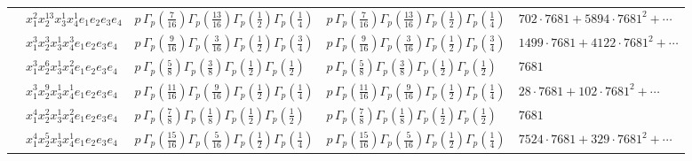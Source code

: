 \documentclass[11pt]{article}
\begin{document}
\begin{table}[ht]
{\begin{tabular}{@{}lllll@{}}
 & $x_{1}^{2} x_{2}^{13} x_{3}^{1} x_{4}^{1}  e_{1} e_{2} e_{3} e_{4}$ & $p \, \Gamma_p \left( \frac{7}{16} \right) \Gamma_p \left( \frac{13}{16} \right) \Gamma_p \left( \frac{1}{2} \right) \Gamma_p \left( \frac{1}{4} \right)$ & $p \, \Gamma_p \left( \frac{7}{16} \right) \Gamma_p \left( \frac{13}{16} \right) \Gamma_p \left( \frac{1}{2} \right) \Gamma_p \left( \frac{1}{4} \right)$ & $702{\cdot}7681{+}5894{\cdot}7681^{2}{+}\cdots$ \\
 & $x_{1}^{3} x_{2}^{3} x_{3}^{1} x_{4}^{3}  e_{1} e_{2} e_{3} e_{4}$ & $p \, \Gamma_p \left( \frac{9}{16} \right) \Gamma_p \left( \frac{3}{16} \right) \Gamma_p \left( \frac{1}{2} \right) \Gamma_p \left( \frac{3}{4} \right)$ & $p \, \Gamma_p \left( \frac{9}{16} \right) \Gamma_p \left( \frac{3}{16} \right) \Gamma_p \left( \frac{1}{2} \right) \Gamma_p \left( \frac{3}{4} \right)$ & $1499{\cdot}7681{+}4122{\cdot}7681^{2}{+}\cdots$ \\
 & $x_{1}^{3} x_{2}^{6} x_{3}^{1} x_{4}^{2}  e_{1} e_{2} e_{3} e_{4}$ & $p \, \Gamma_p \left( \frac{5}{8} \right) \Gamma_p \left( \frac{3}{8} \right) \Gamma_p \left( \frac{1}{2} \right) \Gamma_p \left( \frac{1}{2} \right)$ & $p \, \Gamma_p \left( \frac{5}{8} \right) \Gamma_p \left( \frac{3}{8} \right) \Gamma_p \left( \frac{1}{2} \right) \Gamma_p \left( \frac{1}{2} \right)$ & $7681$ \\
 & $x_{1}^{3} x_{2}^{9} x_{3}^{1} x_{4}^{1}  e_{1} e_{2} e_{3} e_{4}$ & $p \, \Gamma_p \left( \frac{11}{16} \right) \Gamma_p \left( \frac{9}{16} \right) \Gamma_p \left( \frac{1}{2} \right) \Gamma_p \left( \frac{1}{4} \right)$ & $p \, \Gamma_p \left( \frac{11}{16} \right) \Gamma_p \left( \frac{9}{16} \right) \Gamma_p \left( \frac{1}{2} \right) \Gamma_p \left( \frac{1}{4} \right)$ & $28{\cdot}7681{+}102{\cdot}7681^{2}{+}\cdots$ \\
 & $x_{1}^{4} x_{2}^{2} x_{3}^{1} x_{4}^{2}  e_{1} e_{2} e_{3} e_{4}$ & $p \, \Gamma_p \left( \frac{7}{8} \right) \Gamma_p \left( \frac{1}{8} \right) \Gamma_p \left( \frac{1}{2} \right) \Gamma_p \left( \frac{1}{2} \right)$ & $p \, \Gamma_p \left( \frac{7}{8} \right) \Gamma_p \left( \frac{1}{8} \right) \Gamma_p \left( \frac{1}{2} \right) \Gamma_p \left( \frac{1}{2} \right)$ & $7681$ \\
 & $x_{1}^{4} x_{2}^{5} x_{3}^{1} x_{4}^{1}  e_{1} e_{2} e_{3} e_{4}$ & $p \, \Gamma_p \left( \frac{15}{16} \right) \Gamma_p \left( \frac{5}{16} \right) \Gamma_p \left( \frac{1}{2} \right) \Gamma_p \left( \frac{1}{4} \right)$ & $p \, \Gamma_p \left( \frac{15}{16} \right) \Gamma_p \left( \frac{5}{16} \right) \Gamma_p \left( \frac{1}{2} \right) \Gamma_p \left( \frac{1}{4} \right)$ & $7524{\cdot}7681{+}329{\cdot}7681^{2}{+}\cdots$ \\

\end{tabular}}
\end{table}
\end{document}
